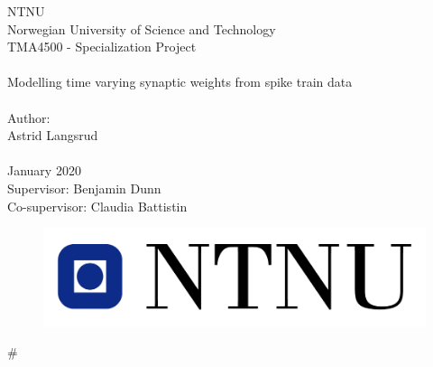 \documentclass[pdftex,10pt,b5paper,twoside]{book}
\begin{document}
\graphicspath{{fig/}}


\thispagestyle{empty}

\begin{center}

\Large{NTNU}\\
\normalsize{Norwegian University of Science and Technology}\\
[3pc]
\Large{TMA4500 - Specialization Project}\\

\Huge{\hrulefill\\Modelling time varying synaptic weights from spike train data \\\hrulefill}\\[2pc]
\small{Author:}\\\Large{Astrid Langsrud}\\
\mbox{}\\[3pc]
\large{January 2020}\\[2pc]

\small{Supervisor: Benjamin Dunn}\\
\small{Co-supervisor: Claudia Battistin}

\end{center}
\vfill

\begin{figure}[h]
\centering
\includegraphics[scale=0.5]{fig/ntnu-logo.jpg}
\label{fig:frontpage_logo}
\end{figure}


#		%








\end{document}
